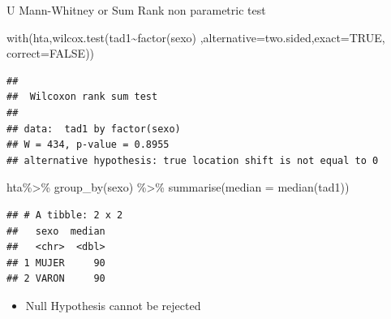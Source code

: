 \documentclass[
  ignorenonframetext,
]{beamer}
\newenvironment{Shaded}{\begin{snugshade}}{\end{snugshade}}
\newcommand{\AttributeTok}[1]{\textcolor[rgb]{0.77,0.63,0.00}{#1}}
\newcommand{\ConstantTok}[1]{\textcolor[rgb]{0.00,0.00,0.00}{#1}}
\newcommand{\FunctionTok}[1]{\textcolor[rgb]{0.00,0.00,0.00}{#1}}
\newcommand{\NormalTok}[1]{#1}
\newcommand{\SpecialCharTok}[1]{\textcolor[rgb]{0.00,0.00,0.00}{#1}}
\newcommand{\StringTok}[1]{\textcolor[rgb]{0.31,0.60,0.02}{#1}}
\providecommand{\tightlist}{%
  \setlength{\itemsep}{0pt}\setlength{\parskip}{0pt}}
\begin{document}
\begin{frame}[fragile]{U Mann-Whitney or Sum Rank non parametric test}
\protect\hypertarget{u-mann-whitney-or-sum-rank-non-parametric-test}{}
\small

\begin{Shaded}
\begin{Highlighting}[]
\FunctionTok{with}\NormalTok{(hta,}\FunctionTok{wilcox.test}\NormalTok{(tad1}\SpecialCharTok{\textasciitilde{}}\FunctionTok{factor}\NormalTok{(sexo)}
\NormalTok{    ,}\AttributeTok{alternative=}\StringTok{\textquotesingle{}two.sided\textquotesingle{}}\NormalTok{,}\AttributeTok{exact=}\ConstantTok{TRUE}\NormalTok{, }\AttributeTok{correct=}\ConstantTok{FALSE}\NormalTok{))}
\end{Highlighting}
\end{Shaded}

\begin{verbatim}
## 
##  Wilcoxon rank sum test
## 
## data:  tad1 by factor(sexo)
## W = 434, p-value = 0.8955
## alternative hypothesis: true location shift is not equal to 0
\end{verbatim}

\begin{Shaded}
\begin{Highlighting}[]
\NormalTok{hta}\SpecialCharTok{\%\textgreater{}\%} 
  \FunctionTok{group\_by}\NormalTok{(sexo) }\SpecialCharTok{\%\textgreater{}\%} 
  \FunctionTok{summarise}\NormalTok{(}\AttributeTok{median =} \FunctionTok{median}\NormalTok{(tad1)) }
\end{Highlighting}
\end{Shaded}

\begin{verbatim}
## # A tibble: 2 x 2
##   sexo  median
##   <chr>  <dbl>
## 1 MUJER     90
## 2 VARON     90
\end{verbatim}

\begin{itemize}
\tightlist
\item
  Null Hypothesis cannot be rejected
\end{itemize}
\end{frame}
\end{document}
